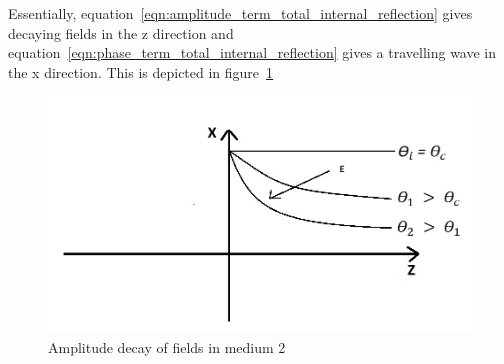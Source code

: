 Essentially, equation~\ref{eqn:amplitude_term_total_internal_reflection} gives decaying fields in the z direction and equation~\ref{eqn:phase_term_total_internal_reflection}  gives a travelling wave in the x direction. This is depicted in figure~\ref{fig:amplitude_decay_total_internal_reflection}
\begin{figure}[h]
\centering
\includegraphics[width=1\linewidth]{./graphics/amplitude_decay}
\caption{Amplitude decay of fields in medium 2}
\label{fig:amplitude_decay_total_internal_reflection}
\end{figure}

